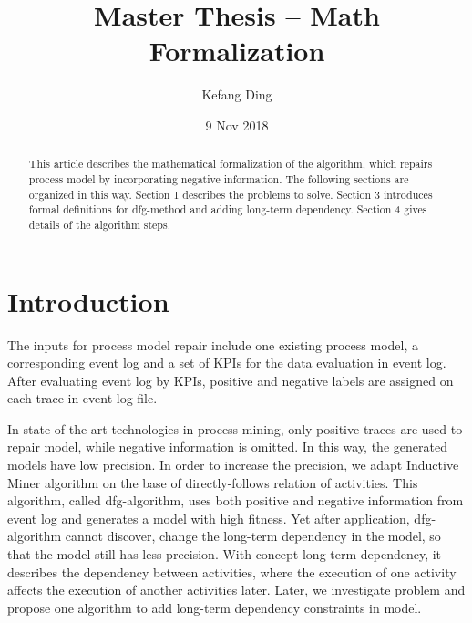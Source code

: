 \documentclass[]{article}
\title{Master Thesis --  Math Formalization}
\author{Kefang Ding}
\date{9 Nov 2018}
\begin{document}
\maketitle

\hrulefill
\hrulefill 

\begin{abstract}
This article describes the mathematical formalization of the algorithm, which repairs process model by incorporating negative information. The following sections are organized in this way. Section 1 describes the problems to solve. Section 3 introduces formal definitions for dfg-method and adding long-term dependency. Section 4 gives details of the algorithm steps. 
\end{abstract}

\section{Introduction}
The inputs for process model repair include one existing process model, a corresponding event log and a set of KPIs for the data evaluation in event log. After evaluating event log by KPIs, positive and negative labels are assigned on each trace in event log file. 

In state-of-the-art technologies in process mining, only positive traces are used to repair model, while negative information is omitted. In this way, the generated models have low precision. In order to increase the precision, we adapt Inductive Miner algorithm on the base of directly-follows relation of activities. This algorithm, called dfg-algorithm, uses both positive and negative information from event log and generates a model with high fitness. Yet after application, dfg-algorithm cannot discover, change the long-term dependency in the model, so that the model still has less precision. With concept long-term dependency, it describes the dependency between activities, where the execution of one activity affects the execution of another activities later. Later, we investigate problem and propose one algorithm to add long-term dependency constraints in model. 
\end{document}
